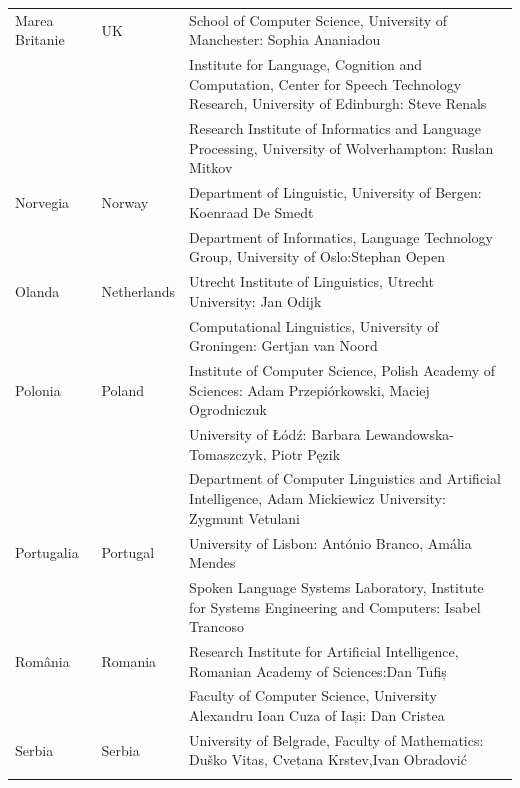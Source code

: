 \begin{longtable}{@{}llp{113mm}@{}}
  Marea Britanie & \textcolor{grey1}{UK} & School of Computer Science, University of Manchester: Sophia Ananiadou \\ \addlinespace 
  & & Institute for Language, Cognition and Computation, Center for Speech Technology Research, University of Edinburgh: Steve Renals \\ \addlinespace 
  & & Research Institute of Informatics and Language Processing, University of Wolverhampton: Ruslan Mitkov \\ \addlinespace 
  Norvegia & \textcolor{grey1}{Norway} & Department of Linguistic, University of Bergen: Koenraad De Smedt\\ \addlinespace 
  & & Department of Informatics, Language Technology Group, University of Oslo:\newline Stephan Oepen \\ \addlinespace
  Olanda & \textcolor{grey1}{Netherlands} & Utrecht Institute of Linguistics, Utrecht University: Jan Odijk\\ \addlinespace 
  & & Computational Linguistics, University of Groningen: Gertjan van Noord\\ \addlinespace
  Polonia & \textcolor{grey1}{Poland} & Institute of Computer Science, Polish Academy of Sciences: Adam Przepiórkowski, Maciej Ogrodniczuk \\ \addlinespace
  & & University of Łódź: Barbara Lewandowska-Tomaszczyk, Piotr Pęzik\\ \addlinespace
  & & Department of Computer Linguistics and Artificial Intelligence, Adam Mickiewicz University: Zygmunt Vetulani \\ \addlinespace
  Portugalia & \textcolor{grey1}{Portugal} & University of Lisbon: António Branco, Amália Mendes \\ \addlinespace
  & & Spoken Language Systems Laboratory, Institute for Systems Engineering and Computers: Isabel Trancoso \\ \addlinespace
  România & \textcolor{grey1}{Romania} & Research Institute for Artificial Intelligence, Romanian Academy of Sciences:\newline Dan Tufiș \\ \addlinespace
  & & Faculty of Computer Science, University Alexandru Ioan Cuza of Iași: Dan Cristea \\ \addlinespace
  Serbia & \textcolor{grey1}{Serbia} & University of Belgrade, Faculty of Mathematics: Duško Vitas, Cvetana Krstev,\newline Ivan Obradović \\ \addlinespace

\end{longtable}
